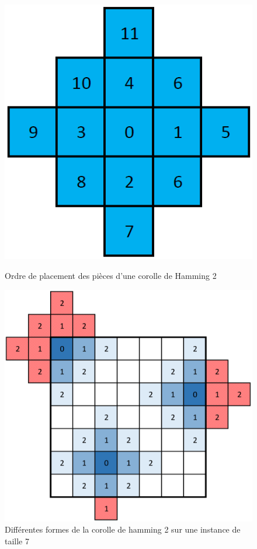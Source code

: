 	\begin{figure}[H]
		\begin{minipage}[t]{0.33\textwidth}
			\includegraphics[width=\linewidth]{images/corolle_simple.png}
			\caption{Ordre de placement des pièces d'une corolle de Hamming 2}\label{fig:corolle}
		\end{minipage}\hfill
		\begin{minipage}[t]{0.66\textwidth}
			\includegraphics[width=\linewidth]{images/corolle_formes.png}
			\caption{Différentes formes de la corolle de hamming 2 sur une instance de taille 7}\label{fig:corolle_forme}
		\end{minipage}\hfill
	\end{figure}
	
